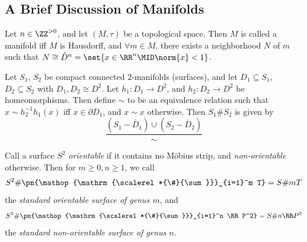 \documentclass[nocover]{pset}
\DeclareMathOperator*{\csum}{\scalerel*{\#}{\sum}}
\begin{document}
\begin{adjustwidth}{1em}{1em}
  \section{A Brief Discussion of Manifolds}

  \begin{definition}[Manifolds]
    Let $n \in \ZZ^{>0}$, and let $(M, \tau)$ be a topological space.
    Then $M$ is called a manifold iff $M$ is Hausdorff, and $\forall m
    \in M$, there exists a neighborhood $N$ of $m$ such that $N \cong
    \mathring{D}^n = \set{x \in \RR^n \MID \norm{x} < 1}$.
  \end{definition}
  \begin{definition}
    Let $S_1$, $S_2$ be compact connected 2-manifolds (surfaces), and
    let $D_1 \subseteq S_1$, $D_2 \subseteq S_2$ with $D_1, D_2 \cong
    D^2$. Let $h_1 : D_1 \to D^2$, and $h_2 : D_2 \to D^2$ be
    homeomorphisms. Then define $\sim$ to be an equivalence relation
    such that $x \sim h^{-1}_2 h_1(x)$ iff $x \in \partial D_1$, and
    $x \sim x$ otherwise. Then $S_1 \# S_2$ is given by
    \[
      \frac{(S_1 - \mathring{D_1}) \cup (S_2 - \mathring{D_2})}{\sim}
    \]
  \end{definition}
  \begin{definition}
    Call a surface $S^2$ \emph{orientable} if it contains no
    M\"{o}bius strip, and \emph{non-orientable} otherwise. Then for $m
    \geq 0, n \geq 1$, we call
    \[
      S^2 \# \pn{\csum_{i=1}^m T} = S \# mT
    \]
    the \emph{standard orientable surface of genus $m$}, and
    \[
      S^2 \# \pn{\csum_{i=1}^n \RR P^2} = S \# n\RR P^2
    \]
    the \emph{standard non-orientable surface of genus $n$}.
  \end{definition}

\end{adjustwidth}
\end{document}
